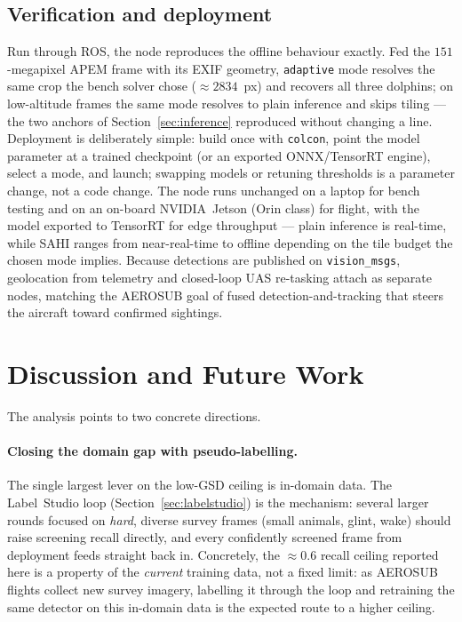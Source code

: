 \documentclass[11pt,a4paper]{article}
\begin{document}
\subsection{Verification and deployment}
Run through ROS, the node reproduces the offline behaviour exactly. Fed the
$151$-megapixel APEM frame with its EXIF geometry, \texttt{adaptive} mode resolves
the same crop the bench solver chose ($\approx\!2834$~px) and recovers all three
dolphins; on low-altitude frames the same mode resolves to plain inference and
skips tiling --- the two anchors of Section~\ref{sec:inference} reproduced without
changing a line. Deployment is deliberately simple: build once with
\texttt{colcon}, point the model parameter at a trained checkpoint (or an exported
ONNX/TensorRT engine), select a mode, and launch; swapping models or retuning
thresholds is a parameter change, not a code change. The node runs unchanged on a
laptop for bench testing and on an on-board NVIDIA~Jetson (Orin class) for flight,
with the model exported to TensorRT for edge throughput --- plain inference is
real-time, while SAHI ranges from near-real-time to offline depending on the tile
budget the chosen mode implies. Because detections are published on
\texttt{vision\_msgs}, geolocation from telemetry and closed-loop UAS re-tasking
attach as separate nodes, matching the AEROSUB goal of fused
detection-and-tracking that steers the aircraft toward confirmed sightings.

\section{Discussion and Future Work}\label{sec:future}
The analysis points to two concrete directions.

\paragraph{Closing the domain gap with pseudo-labelling.}
The single largest lever on the low-GSD ceiling is in-domain data. The
Label~Studio loop (Section~\ref{sec:labelstudio}) is the mechanism: several
larger rounds focused on \emph{hard}, diverse survey frames (small animals,
glint, wake) should raise screening recall directly, and every confidently
screened frame from deployment feeds straight back in. Concretely, the
$\approx\!0.6$ recall ceiling reported here is a property of the \emph{current}
training data, not a fixed limit: as AEROSUB flights collect new survey imagery,
labelling it through the loop and retraining the same detector on this in-domain
data is the expected route to a higher ceiling.
\end{document}
